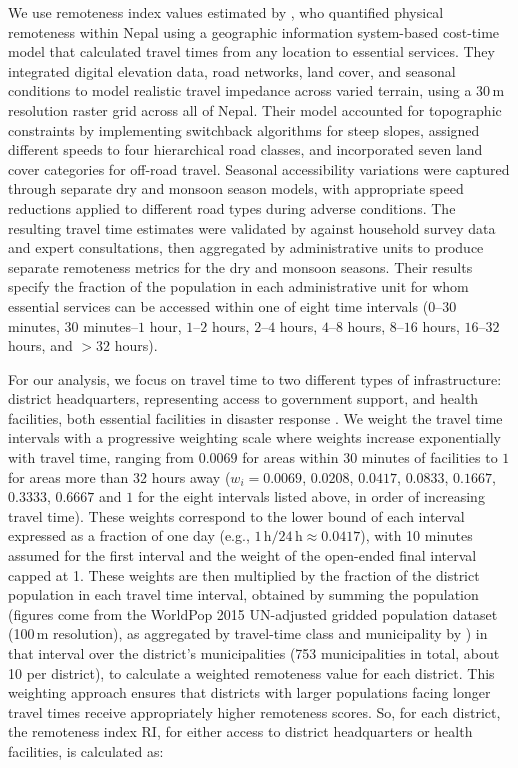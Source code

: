 \documentclass[preprint,12pt,authoryear]{elsarticle}
\begin{document}
We use remoteness index values estimated by \cite{banick2019}, who quantified physical remoteness within Nepal using a geographic information system-based cost-time model that calculated travel times from any location to essential services. They integrated digital elevation data, road networks, land cover, and seasonal conditions to model realistic travel impedance across varied terrain, using a $30\,\text{m}$ resolution raster grid across all of Nepal. Their model accounted for topographic constraints by implementing switchback algorithms for steep slopes, assigned different speeds to four hierarchical road classes, and incorporated seven land cover categories for off-road travel. Seasonal accessibility variations were captured through separate dry and monsoon season models, with appropriate speed reductions applied to different road types during adverse conditions. The resulting travel time estimates were validated by \cite{banick2019} against household survey data and expert consultations, then aggregated by administrative units to produce separate remoteness metrics for the dry and monsoon seasons. Their results specify the fraction of the population in each administrative unit for whom essential services can be accessed within one of eight time intervals ($0$--$30$ minutes, $30$ minutes--$1$ hour, $1$--$2$ hours, $2$--$4$ hours, $4$--$8$ hours, $8$--$16$ hours, $16$--$32$ hours, and $>32$ hours).

For our analysis, we focus on travel time to two different types of infrastructure: district headquarters, representing access to government support, and health facilities, both essential facilities in disaster response \citep{NationalPlanningCommission2015}. We weight the travel time intervals with a progressive weighting scale where weights increase exponentially with travel time, ranging from $0.0069$ for areas within 30 minutes of facilities to $1$ for areas more than 32 hours away ($w_i = 0.0069$, $0.0208$, $0.0417$, $0.0833$, $0.1667$, $0.3333$, $0.6667$ and $1$ for the eight intervals listed above, in order of increasing travel time). These weights correspond to the lower bound of each interval expressed as a fraction of one day (e.g., $1\,\text{h}/24\,\text{h} \approx 0.0417$), with 10 minutes assumed for the first interval and the weight of the open-ended final interval capped at 1. These weights are then multiplied by the fraction of the district population in each travel time interval, obtained by summing the population (figures come from the WorldPop 2015 UN-adjusted gridded population dataset (100\,m resolution), as aggregated by travel-time class and municipality by \citet{banick2019}) in that interval over the district's municipalities (753 municipalities in total, about 10 per district), to calculate a weighted remoteness value for each district. This weighting approach ensures that districts with larger populations facing longer travel times receive appropriately higher remoteness scores. So, for each district, the remoteness index $\text{RI}$, for either access to district headquarters or health facilities, is calculated as:
\end{document}
